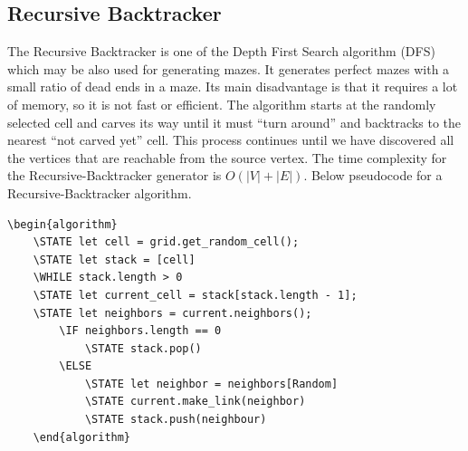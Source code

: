 \subsection{Recursive Backtracker}

The Recursive Backtracker is one of the Depth First Search algorithm (DFS) which may be also used for generating mazes. It generates perfect mazes with a small ratio of dead ends in a maze. Its main disadvantage is that it requires a lot of memory, so it is not fast or efficient. The algorithm starts at the randomly selected cell and carves its way until it must “turn around” and backtracks to the nearest “not carved yet” cell. This process continues until we have discovered all the vertices that are reachable from the source vertex. The time complexity for the Recursive-Backtracker generator is $O(|V|+|E|)$. Below pseudocode for a Recursive-Backtracker algorithm.

\begin{lstlisting}[caption={Pseudocode for a Recursive-Backtracker algorithm}]
	\begin{algorithm}
	\STATE let cell = grid.get_random_cell();
	\STATE let stack = [cell]
	\WHILE stack.length > 0
	\STATE let current_cell = stack[stack.length - 1];
	\STATE let neighbors = current.neighbors();
		\IF neighbors.length == 0
			\STATE stack.pop()
		\ELSE 
			\STATE let neighbor = neighbors[Random]
			\STATE current.make_link(neighbor)
			\STATE stack.push(neighbour)	
	\end{algorithm}
	\end{lstlisting}

